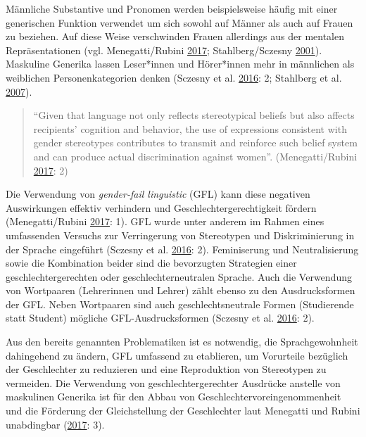 \documentclass[12pt,ngerman,]{article}
\begin{document}
Männliche Substantive und Pronomen werden beispielsweise häufig mit
einer generischen Funktion verwendet um sich sowohl auf Männer als auch
auf Frauen zu beziehen. Auf diese Weise verschwinden Frauen allerdings
aus der mentalen Repräsentationen (vgl. Menegatti/Rubini
\protect\hyperlink{ref-menegatti_2017}{2017}; Stahlberg/Sczesny
\protect\hyperlink{ref-stahlberg_2001}{2001}). Maskuline Generika lassen
Leser*innen und Hörer*innen mehr in männlichen als weiblichen
Personenkategorien denken (Sczesny et al.
\protect\hyperlink{ref-sczesny_2016}{2016}: 2; Stahlberg et al.
\protect\hyperlink{ref-stahlberg_2007}{2007}).

\begin{quote}
\enquote{Given that language not only reflects stereotypical beliefs but
also affects recipients' cognition and behavior, the use of expressions
consistent with gender stereotypes contributes to transmit and reinforce
such belief system and can produce actual discrimination against women}.
(Menegatti/Rubini \protect\hyperlink{ref-menegatti_2017}{2017}: 2)
\end{quote}

Die Verwendung von \emph{gender-fail linguistic} (GFL) kann diese
negativen Auswirkungen effektiv verhindern und Geschlechtergerechtigkeit
fördern (Menegatti/Rubini \protect\hyperlink{ref-menegatti_2017}{2017}:
1). GFL wurde unter anderem im Rahmen eines umfassenden Versuchs zur
Verringerung von Stereotypen und Diskriminierung in der Sprache
eingeführt (Sczesny et al. \protect\hyperlink{ref-sczesny_2016}{2016}:
2). Feminiserung und Neutralisierung sowie die Kombination beider sind
die bevorzugten Strategien einer geschlechtergerechten oder
geschlechterneutralen Sprache. Auch die Verwendung von Wortpaaren
(Lehrerinnen und Lehrer) zählt ebenso zu den Ausdrucksformen der GFL.
Neben Wortpaaren sind auch geschlechtsneutrale Formen (Studierende statt
Student) mögliche GFL-Ausdrucksformen (Sczesny et al.
\protect\hyperlink{ref-sczesny_2016}{2016}: 2).

Aus den bereits genannten Problematiken ist es notwendig, die
Sprachgewohnheit dahingehend zu ändern, GFL umfassend zu etablieren, um
Vorurteile bezüglich der Geschlechter zu reduzieren und eine
Reproduktion von Stereotypen zu vermeiden. Die Verwendung von
geschlechtergerechter Ausdrücke anstelle von maskulinen Generika ist für
den Abbau von Geschlechtervoreingenommenheit und die Förderung der
Gleichstellung der Geschlechter laut Menegatti und Rubini unabdingbar
(\protect\hyperlink{ref-menegatti_2017}{2017}: 3).
\end{document}
